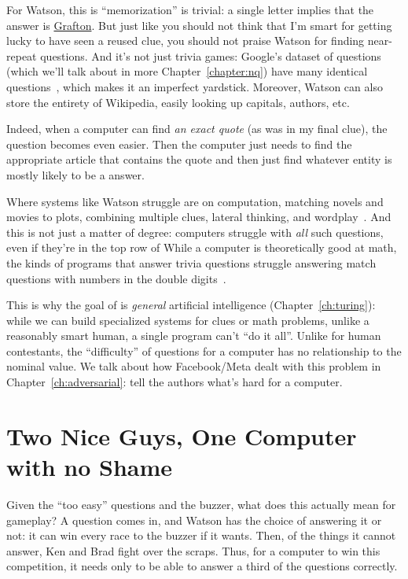 For Watson, this is ``memorization'' is trivial: a single letter
implies that the answer is \underline{Grafton}.
%
But just like you should not think that I'm smart for getting lucky to
have seen a reused clue, you should not praise Watson for finding
near-repeat questions.
%
And it's not just trivia games: Google's dataset of questions (which
we'll talk about in more Chapter~\ref{chapter:nq}) have
many identical questions~\citep{lewis-21}, which makes it an imperfect yardstick.
%
Moreover, Watson can also store the entirety of Wikipedia, easily
looking up capitals, authors, etc.

Indeed, when a computer can find \emph{an exact quote} (as was in my
final \jeopardy{} clue), the question becomes even easier.
%
Then the computer just needs to find the appropriate article that
contains the quote and then just find whatever entity is mostly likely
to be a \jeopardy{} answer.

Where systems like Watson struggle are on computation, matching novels
and movies to plots, combining multiple clues, lateral thinking, and
wordplay~\citep{kaushik-18}.
%
And this is not just a matter of degree: computers struggle with \emph{all}
such questions, even if they're in the top row of \jeopardyf{}
%
While a computer is theoretically good at math, the kinds of programs
that answer trivia questions struggle answering match questions with
numbers in the double digits~\citep{wallace-19:numbers}.

This is why the goal of  is \emph{general} artificial
intelligence (Chapter~\ref{ch:turing}): while we can build specialized
systems for \jeopardy{} clues or math problems, unlike a
reasonably smart human, a single program can't ``do it all''.
%
Unlike for human contestants, the ``difficulty'' of \jeopardy{}
questions for a computer has no relationship to the nominal value.
%
We talk about how Facebook/Meta dealt with this problem in
Chapter~\ref{ch:adversarial}: tell the authors what's hard for a computer.

\section{Two Nice Guys, One Computer with no Shame}
\label{sec:watson:strategy}

Given the ``too easy'' questions and the buzzer, what does this
actually mean for gameplay?
%
A question comes in, and Watson has the choice of answering it or not:
it can win every race to the buzzer if it wants.
%
Then, of the things it cannot answer, Ken and Brad fight over the
scraps.
%
Thus, for a computer to win this competition, it needs only to be able
to answer a third of the questions correctly.

